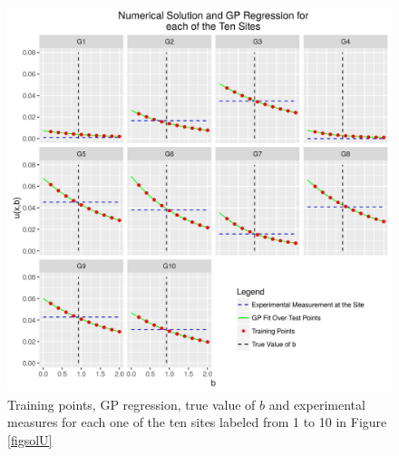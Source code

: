 \documentclass[12pt]{book}
\begin{document}
\begin{figure}[H]
\centering
\includegraphics[scale=0.7]{./FigChap3/fitted}
\caption{Training points, GP regression, true value of $b$ and experimental measures for each one of the ten sites labeled
from 1 to 10 in Figure \ref{figsolU}}
\label{fignofitted}
\end{figure}
\end{document}
